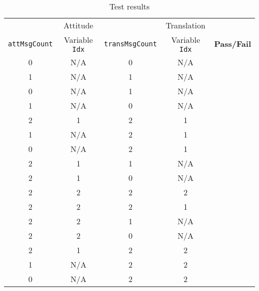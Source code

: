 \begin{table}[H]
	\caption{Test results}
	\label{tab:results}
	\centering \fontsize{10}{10}\selectfont
	\begin{tabular}{c | c | c | c | c  } %
		\hline\hline
		 & Attitude  &  & Translation  & \\ 
		{\tt attMsgCount} &  Variable {\tt Idx} & {\tt transMsgCount} &  Variable {\tt Idx} &\textbf{Pass/Fail} \\ 
		\hline
	   0 & N/A  & 0 & N/A &  \\ 
	   1 & N/A  & 1 & N/A &  \\ 
	   0 & N/A  & 1 & N/A &  \\ 
	   1 & N/A  & 0 & N/A &  \\ 
	   2 & 1  & 2 & 1 &  \\ 
	   1 & N/A  & 2 & 1 &  \\ 
	   0 & N/A  & 2 & 1 &  \\ 
	   2 & 1  & 1 & N/A &  \\ 
	   2 & 1  & 0 & N/A &  \\ 
	   2 & 2  & 2 & 2 &  \\ 
	   2 & 2  & 2 & 1 &  \\ 
	   2 & 2  & 1 & N/A &  \\ 
	   2 & 2  & 0 & N/A &  \\ 
	   2 & 1  & 2 & 2 &  \\ 
	   1 & N/A  & 2 & 2 &  \\ 
	   0 & N/A & 2 & 2 &  \\ 
	   \hline\hline
	\end{tabular}
\end{table}

